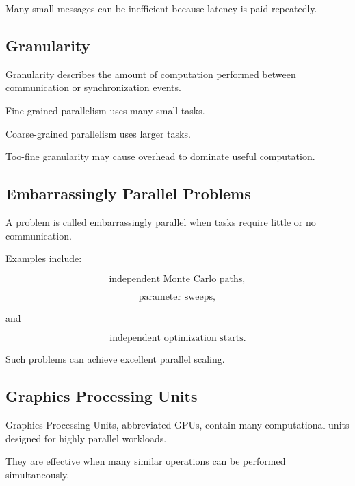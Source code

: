 Many small messages can be inefficient because latency is paid repeatedly.

\subsection{Granularity}
\label{subsec:parallel-granularity}

Granularity describes the amount of computation performed between
communication or synchronization events.

Fine-grained parallelism uses many small tasks.

Coarse-grained parallelism uses larger tasks.

Too-fine granularity may cause overhead to dominate useful computation.

\subsection{Embarrassingly Parallel Problems}
\label{subsec:embarrassingly-parallel}

A problem is called embarrassingly parallel when tasks require little or no
communication.

Examples include:

\[
\boxed{
\text{independent Monte Carlo paths},
}
\]

\[
\boxed{
\text{parameter sweeps},
}
\]

and

\[
\boxed{
\text{independent optimization starts}.
}
\]

Such problems can achieve excellent parallel scaling.

\subsection{Graphics Processing Units}
\label{subsec:gpu-computing}

Graphics Processing Units, abbreviated GPUs, contain many computational
units designed for highly parallel workloads.

They are effective when many similar operations can be performed
simultaneously.

